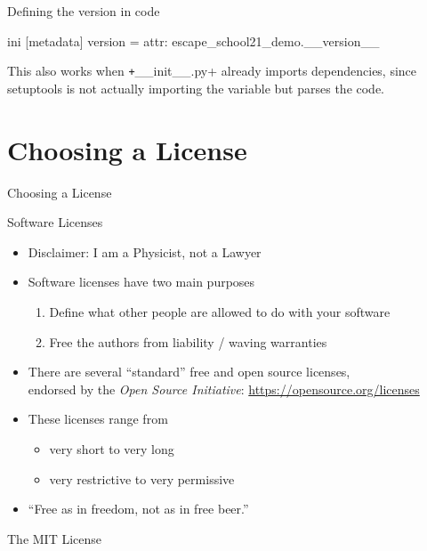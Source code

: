 \documentclass[
  aspectratio=1610,
]{beamer}
\newcommand\headlineframe[1]{%
  \begin{frame}[c]%
    \begin{center}%
      \Huge\color{vertexDarkRed}#1%
    \end{center}%
  \end{frame}%
}%
\begin{document}
\begin{frame}[fragile, c]{Defining the version in code}

  \begin{code}[title=setup.cfg]{ini}
    [metadata]
    version = attr: escape_school21_demo.__version__
  \end{code}

  This also works when \texttt+__init__.py+ already imports dependencies,
  since setuptools is not actually importing the variable but parses the code.
\end{frame}


\section{Choosing a License}
\headlineframe{Choosing a License}

\begin{frame}[c]{Software Licenses}
  \begin{itemize}
    \item Disclaimer: I am a Physicist, not a Lawyer
    \item Software licenses have two main purposes
      \begin{enumerate}
        \item Define what other people are allowed to do with your software
        \item Free the authors from liability / waving warranties
      \end{enumerate}
    \item There are several \enquote{standard} free and open source licenses,\\
      endorsed by the \emph{Open Source Initiative}: \url{https://opensource.org/licenses}
    \item These licenses range from
      \begin{itemize}
        \item very short to very long
        \item very restrictive to very permissive
      \end{itemize}
    \item \enquote{Free as in freedom, not as in free beer.}
  \end{itemize}
\end{frame}

\begin{frame}[c]{The MIT License}
  \small
  
\end{frame}
\end{document}
